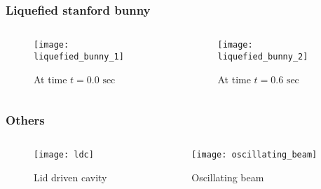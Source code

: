 \begin{frame}
    \frametitle{Liquefied stanford bunny}
    \begin{columns}[onlytextwidth]
        \begin{column}{0.5\textwidth}
            \begin{figure}[ht]
                \centering
                \texttt{[image: liquefied\_bunny\_1]}
                \caption{At time $t = 0.0 \text{ sec}$}
            \end{figure}
        \end{column}
        \begin{column}{0.5\textwidth}
            \begin{figure}[ht]
                \centering
                \texttt{[image: liquefied\_bunny\_2]}
                \caption{At time $t = 0.6 \text{ sec}$}
            \end{figure}
        \end{column}
    \end{columns}
\end{frame}
\begin{frame}
    \frametitle{Others}
    \begin{columns}[onlytextwidth]
        \begin{column}{0.5\textwidth}
            \begin{figure}[ht]
                \centering
                \texttt{[image: ldc]}
                \caption{Lid driven cavity}
            \end{figure}
        \end{column}
        \begin{column}{0.5\textwidth}
            \begin{figure}[ht]
                \centering
                \texttt{[image: oscillating\_beam]}
                \caption{Oscillating beam}
            \end{figure}
        \end{column}
    \end{columns}
\end{frame}
